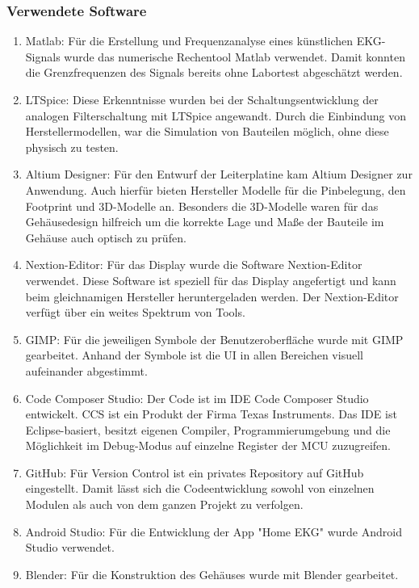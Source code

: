\subsubsection{Verwendete Software}
\begin{enumerate}
	\item Matlab: Für die Erstellung und Frequenzanalyse eines künstlichen EKG-Signals wurde das numerische Rechentool Matlab verwendet. Damit konnten die Grenzfrequenzen des Signals bereits ohne Labortest abgeschätzt werden. 
	\item LTSpice: Diese Erkenntnisse wurden bei der Schaltungsentwicklung der analogen Filterschaltung mit LTSpice angewandt. Durch die Einbindung von Herstellermodellen, war die Simulation von Bauteilen möglich, ohne diese physisch zu testen.
	\item Altium Designer: Für den Entwurf der Leiterplatine kam Altium Designer zur Anwendung. Auch hierfür bieten Hersteller Modelle für die Pinbelegung, den Footprint und 3D-Modelle an. Besonders die 3D-Modelle waren für das Gehäusedesign hilfreich um die korrekte Lage und Maße der Bauteile im Gehäuse auch optisch zu prüfen.
	\item Nextion-Editor: Für das Display wurde die Software Nextion-Editor verwendet.  \cite{Nextion_Editor} Diese Software ist speziell für das Display angefertigt und kann beim gleichnamigen Hersteller heruntergeladen werden. Der Nextion-Editor verfügt über ein weites Spektrum von Tools. 
	\item GIMP: Für die jeweiligen Symbole der Benutzeroberfläche wurde mit GIMP gearbeitet. Anhand der Symbole ist die UI in allen Bereichen visuell aufeinander abgestimmt. \cite{GIMP}
	\item Code Composer Studio: Der Code ist im IDE Code Composer Studio entwickelt. CCS ist ein Produkt der Firma Texas Instruments. Das IDE ist Eclipse-basiert, besitzt eigenen Compiler, Programmierumgebung und die Möglichkeit im Debug-Modus auf einzelne Register der MCU zuzugreifen. \cite{CCS}
	\item GitHub: Für Version Control ist ein privates Repository auf GitHub eingestellt. Damit lässt sich die Codeentwicklung sowohl von einzelnen Modulen als auch von dem ganzen Projekt zu verfolgen.
	\item Android Studio: Für die Entwicklung der App "Home EKG" wurde Android Studio verwendet.
	\item Blender: Für die Konstruktion des Gehäuses wurde mit Blender gearbeitet.
\end{enumerate}
	
